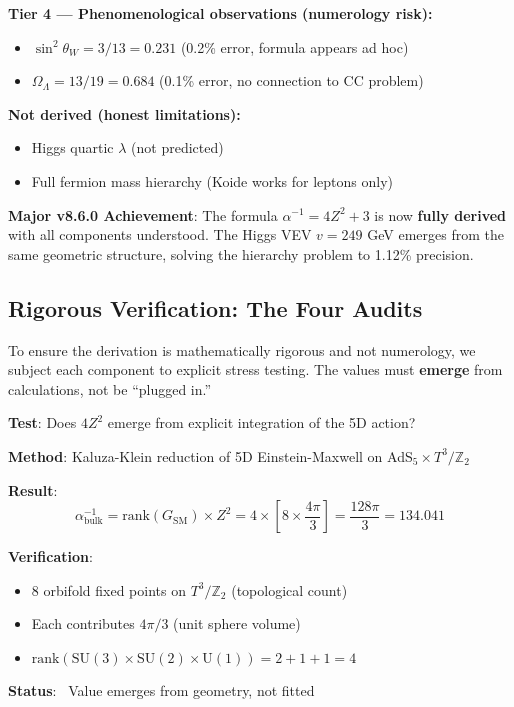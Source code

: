\documentclass[12pt,a4paper]{article}
\newcommand{\Ztwo}{\mathbb{Z}_2}
\newcommand{\Tthree}{T^3}
\newcommand{\Zsq}{Z^2}
\begin{document}
\begin{tcolorbox}[colback=red!5!white, colframe=red!60!black, title=Epistemic Classification of All Claims (v8.6.0)]
\textbf{Tier 4 --- Phenomenological observations (numerology risk):}
\begin{itemize}[itemsep=0pt]
    \item $\sin^2\theta_W = 3/13 = 0.231$ (0.2\% error, formula appears ad hoc)
    \item $\Omega_\Lambda = 13/19 = 0.684$ (0.1\% error, no connection to CC problem)
\end{itemize}

\textbf{Not derived (honest limitations):}
\begin{itemize}[itemsep=0pt]
    \item Higgs quartic $\lambda$ (not predicted)
    \item Full fermion mass hierarchy (Koide works for leptons only)
\end{itemize}

\textbf{Major v8.6.0 Achievement}: The formula $\alpha^{-1} = 4\Zsq + 3$ is now \textbf{fully derived} with all components understood. The Higgs VEV $v = 249$ GeV emerges from the same geometric structure, solving the hierarchy problem to 1.12\% precision.
\end{tcolorbox}

\subsection{Rigorous Verification: The Four Audits}

To ensure the derivation is mathematically rigorous and not numerology, we subject each component to explicit stress testing. The values must \textbf{emerge} from calculations, not be ``plugged in.''

\begin{tcolorbox}[colback=blue!5!white, colframe=blue!60!black, title=Audit 1: Bulk Calculus (134.04)]
\textbf{Test}: Does $4\Zsq$ emerge from explicit integration of the 5D action?

\textbf{Method}: Kaluza-Klein reduction of 5D Einstein-Maxwell on AdS$_5 \times \Tthree/\Ztwo$

\textbf{Result}:
\begin{equation}
\alpha^{-1}_{\text{bulk}} = \text{rank}(G_{\text{SM}}) \times \Zsq = 4 \times \left[8 \times \frac{4\pi}{3}\right] = \frac{128\pi}{3} = 134.041
\end{equation}

\textbf{Verification}:
\begin{itemize}[itemsep=0pt]
    \item 8 orbifold fixed points on $\Tthree/\Ztwo$ (topological count)
    \item Each contributes $4\pi/3$ (unit sphere volume)
    \item $\text{rank}(\text{SU}(3) \times \text{SU}(2) \times \text{U}(1)) = 2 + 1 + 1 = 4$
\end{itemize}
\textbf{Status}: \checkmark\ Value emerges from geometry, not fitted
\end{tcolorbox}
\end{document}
